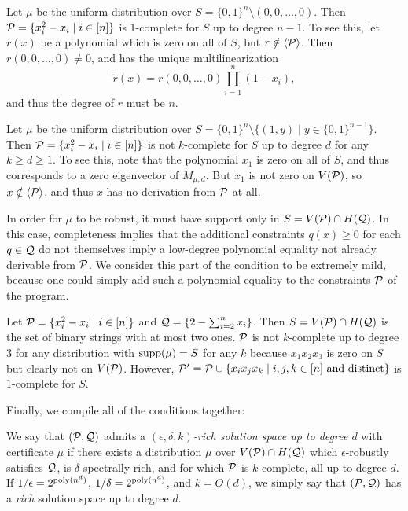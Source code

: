 \begin{example}
Let $\mu$ be the uniform distribution over $S = \{0,1\}^n \setminus (0,0,\dots,0)$. Then $\mathcal P = \{x_i^2 - x_i \mid i \in [n]\}$ is $1$-complete for $S$ up to degree $n-1$. To see this, let $r(x)$ be a polynomial which is zero on all of $S$, but $r \notin \langle \mathcal P \rangle$. Then $r(0,0,\dots,0) \neq 0$, and has the unique multilinearization 
\[\tilde{r}(x) = r(0,0,\dots,0)\prod_{i=1}^n \left(1-x_i\right),\]
and thus the degree of $r$ must be $n$.
\end{example}
\begin{example}\label{ex:not-complete}
Let $\mu$ be the uniform distribution over $S = \{0,1\}^n \setminus \{(1,y) \mid y \in \{0,1\}^{n-1}\}$. Then $\mathcal P = \{x_i^2 - x_i \mid i \in [n]\}$ is not $k$-complete for $S$ up to degree $d$ for any $k \geq d \geq 1$. To see this, note that the polynomial $x_1$ is zero on all of $S$, and thus corresponds to a zero eigenvector of $M_{\mu,d}$. But $x_1$ is not zero on $V(\mathcal P)$, so $x \notin \langle \mathcal P \rangle$, and thus $x$ has no derivation from $\mathcal P$ at all. 
\end{example}
In order for $\mu$ to be robust, it must have support only in $S = V(\mathcal P) \cap H(\mathcal Q)$. In this case, completeness implies that the additional constraints $q(x) \geq 0$ for each $q \in \mathcal Q$ do not themselves imply a low-degree polynomial equality not already derivable from $\mathcal P$. We consider this part of the condition to be extremely mild, because one could simply add such a polynomial equality to the constraints $\mathcal P$ of the program. 
\begin{example}
Let $\mathcal P = \{x_i^2 - x_i \mid i \in [n]\}$ and $\mathcal Q = \{2 - \sum_{i=2}^n x_i\}$. Then $S = V(\mathcal P) \cap H(\mathcal Q)$ is the set of binary strings with at most two ones. $\mathcal P$ is not $k$-complete up to degree $3$ for any distribution with $\operatorname{supp}(\mu) = S$ for any $k$ because $x_1x_2x_3$ is zero on $S$ but clearly not on $V(\mathcal P)$. However, $\mathcal P' = \mathcal P \cup \{x_ix_jx_k \mid i,j,k \in [n] \text{ and distinct}\}$ is $1$-complete for $S$.
\end{example}

Finally, we compile all of the conditions together:
\begin{definition}
We say that $(\mathcal P, \mathcal Q)$ admits a \emph{$(\epsilon,\delta,k)$-rich solution space up to degree $d$} with certificate $\mu$ if there exists a distribution $\mu$ over $V(\mathcal P) \cap H(\mathcal Q)$ which $\epsilon$-robustly satisfies $\mathcal Q$, is $\delta$-spectrally rich, and for which $\mathcal P$ is $k$-complete, all up to degree $d$. If $1/\epsilon = 2^{\operatorname{poly}(n^d)}$, $1/\delta = 2^{\operatorname{poly}(n^d)}$, and $k = O(d)$, we simply say that $(\mathcal P, \mathcal Q)$ has a \emph{rich} solution space up to degree $d$.
\end{definition}

